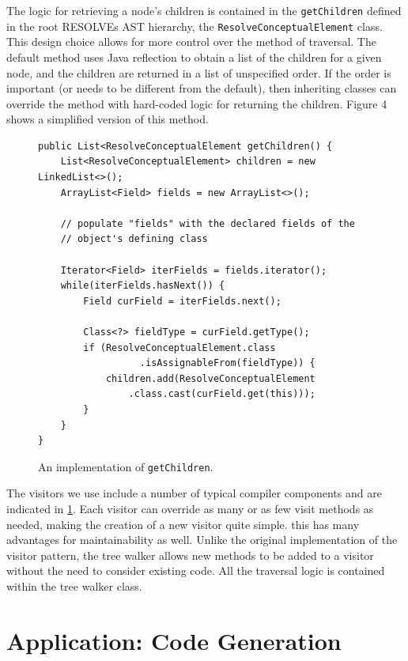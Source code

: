 \documentclass[times]{speauth}
\begin{document}
The logic for retrieving a node's children is contained in the \texttt{getChildren} defined in the root RESOLVEs AST hierarchy, the \texttt{ResolveConceptualElement} class. This design choice allows for more control over the method of traversal. The default method uses Java reflection to obtain a list of the children for a given node, and the children are returned in a list of unspecified order. If the order is important (or needs to be different from the default), then inheriting classes can override the method with hard-coded logic for returning the children. Figure 4 shows a simplified version of this method.

\begin{figure}[!htb]
\centering
\begin{verbatim}
public List<ResolveConceptualElement getChildren() {
    List<ResolveConceptualElement> children = new LinkedList<>();
    ArrayList<Field> fields = new ArrayList<>();
    
    // populate "fields" with the declared fields of the 
    // object's defining class
    
    Iterator<Field> iterFields = fields.iterator();
    while(iterFields.hasNext()) {
        Field curField = iterFields.next();
        
        Class<?> fieldType = curField.getType();
        if (ResolveConceptualElement.class
                  .isAssignableFrom(fieldType)) {
            children.add(ResolveConceptualElement
                .class.cast(curField.get(this)));
        }
    }
}
\end{verbatim}
\caption{An implementation of \texttt{getChildren}.}
\label{fig:getchildren}
\end{figure}


The visitors we use include a number of typical compiler components and are indicated in \ref{fig:getchildren}. Each visitor can override as many or as few visit methods as needed, making the creation of a new visitor quite simple. this has many advantages for maintainability as well. Unlike the original implementation of the visitor pattern, the tree walker allows new methods to be added to a visitor without the need to consider existing code. All the traversal logic is contained within the tree walker class. 

\section{Application: Code Generation}
\vspace{-2pt}
\end{document}
